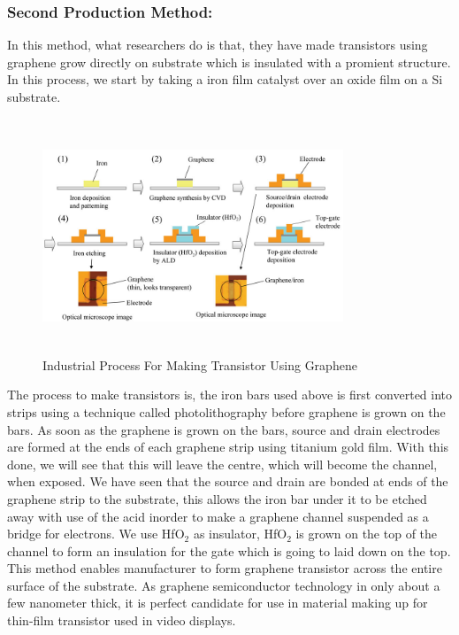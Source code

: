 \documentclass[conference]{IEEEtran}
\begin{document}
\subsubsection{\textbf{Second Production Method:}}
In this method, what researchers do is that, they have made transistors using graphene grow directly on substrate which is insulated with a promient structure. In this process, we start by taking a iron film catalyst over an oxide film on a Si substrate.

\begin{figure}[h]
\centering
\includegraphics[width=9cm, height=7cm]{3.jpg}
\caption{Industrial Process For Making Transistor Using Graphene}
\end{figure}

The process to make transistors is, the iron bars used above is first converted into strips using a technique called photolithography before graphene is grown on the bars. As soon as the graphene is grown on the bars, source and drain electrodes are formed at the ends of each graphene strip using titanium gold film. With this done, we will see that this will leave the centre, which will become the channel, when exposed. We have seen that the source and drain are bonded at ends of the graphene strip to the substrate, this allows the iron bar under it to be etched away with use of the acid inorder to make a graphene channel suspended as a bridge for electrons. We use HfO$_2$ as insulator, HfO$_2$ is grown on the top of the channel to form an insulation for the gate which is going to laid down on the top. This method enables manufacturer to form graphene transistor across the entire surface of the substrate. As graphene semiconductor technology in only about a few nanometer thick, it is perfect candidate for use in material making up for thin-film transistor used in video displays.
\\
\end{document}
